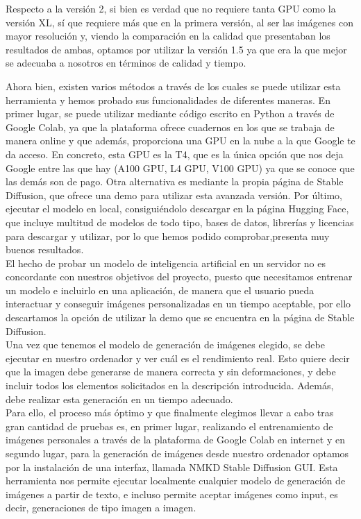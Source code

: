 Respecto a la versión 2, si bien es verdad que no requiere tanta GPU como la versión XL, sí que requiere más que en la primera versión, al ser las imágenes con mayor resolución y, viendo la comparación en la calidad que presentaban los resultados de ambas, optamos por utilizar la versión 1.5 ya que era la que mejor se adecuaba a nosotros en términos de calidad y tiempo.


Ahora bien, existen varios métodos a través de los cuales se puede utilizar esta herramienta y hemos probado sus funcionalidades de diferentes maneras. En primer lugar, se puede utilizar mediante código escrito en Python a través de Google Colab, ya que la plataforma ofrece cuadernos en los que se trabaja de manera online y que además, proporciona una GPU en la nube a la que Google te da acceso. En concreto, esta GPU es la T4, que es la única opción que nos deja Google entre las que hay (A100 GPU, L4 GPU, V100 GPU) ya que se conoce que las demás son de pago. Otra alternativa es mediante la propia página de Stable Diffusion, que ofrece una demo para utilizar esta avanzada versión. Por último, ejecutar el modelo en local, consiguiéndolo descargar en la página Hugging Face, que incluye multitud de modelos de todo tipo, bases de datos, librerías y licencias para descargar y utilizar, por lo que hemos podido comprobar,presenta muy buenos resultados.\\

El hecho de probar un modelo de inteligencia artificial en un servidor no es concordante con nuestros objetivos del proyecto, puesto que necesitamos entrenar un modelo e incluirlo en una aplicación, de manera que el usuario pueda interactuar y conseguir imágenes personalizadas en un tiempo aceptable, por ello descartamos la opción de utilizar la demo que se encuentra en la página de Stable Diffusion. \\

Una vez que tenemos el modelo de generación de imágenes elegido, se debe ejecutar en nuestro ordenador y ver cuál es el rendimiento real. Esto quiere decir que la imagen debe generarse de manera correcta y sin deformaciones, y debe incluir todos los elementos solicitados en la descripción introducida. Además, debe realizar esta generación en un tiempo adecuado.\\

Para ello, el proceso más óptimo y que finalmente elegimos llevar a cabo tras gran cantidad de pruebas es, en primer lugar, realizando el entrenamiento de imágenes personales a través de la plataforma de Google Colab en internet y en segundo lugar, para la generación de imágenes desde nuestro ordenador optamos por la instalación de una interfaz, llamada NMKD Stable Diffusion GUI. Esta herramienta nos permite ejecutar localmente cualquier modelo de generación de imágenes a partir de texto, e incluso permite aceptar imágenes como input, es decir, generaciones de tipo imagen a imagen. 

